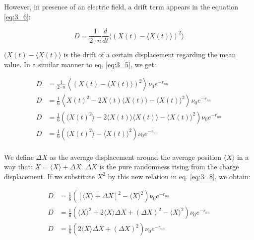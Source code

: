 However, in presence of an electric field, a drift term appears in the equation \ref{eq:3_6}:

\begin{equation}
    D = \frac{1}{2 \cdot n} \frac{d}{d t} \langle (X(t) - \langle X(t) \rangle)^2 \rangle
    \label{eq:3_7}
\end{equation}

$(X(t) - \langle X(t) \rangle$ is the drift of a certain displacement regarding the mean value. In a similar manner to eq. \ref{eq:3_5}, we get:

\begin{equation}
    \begin{aligned}
        D &= \frac{1}{2 \cdot n} \left\langle (X(t) - \langle X(t) \rangle)^2 \right\rangle \nu_0 e^{-r_{nn}} \\
        D &= \frac{1}{6} \left\langle X(t)^2 - 2X(t)\langle X(t) \rangle - \langle X(t) \rangle^2 \right\rangle \nu_0 e^{-r_{nn}} \\
        D &= \frac{1}{6} \left(\langle X(t)^2 \rangle - 2 \langle X(t)\rangle \langle X(t) \rangle - \langle X(t) \rangle^2\right) \nu_0 e^{-r_{nn}} \\
        D &= \frac{1}{6} \left(\langle X(t)^2 \rangle - \langle X(t) \rangle^2\right) \nu_0 e^{-r_{nn}} \\
    \end{aligned}
    \label{eq:3_8}
\end{equation}

We define $\Delta X$ as the average displacement around the average position $\langle X \rangle$ in a way that: $X = \langle X \rangle + \Delta X$. $\Delta X$ is the pure randomness rising from the charge displacement. If we substitute $X^2$ by this new relation in eq. \ref{eq:3_8}, we obtain:

\begin{equation}
    \begin{aligned}
        D &= \frac{1}{6} \left( [\langle X \rangle + \Delta X]^2 - \langle X \rangle^2 \right) \nu_0 e^{-r_{nn}} \\
        D &= \frac{1}{6} \left( \langle X \rangle^2 + 2\langle X \rangle\Delta X + (\Delta X)^2 - \langle X \rangle^2 \right) \nu_0 e^{-r_{nn}} \\
        D &= \frac{1}{6} \left( 2\langle X \rangle\Delta X + (\Delta X)^2 \right) \nu_0 e^{-r_{nn}} \\
    \end{aligned}
    \label{eq:3_9}
\end{equation}

